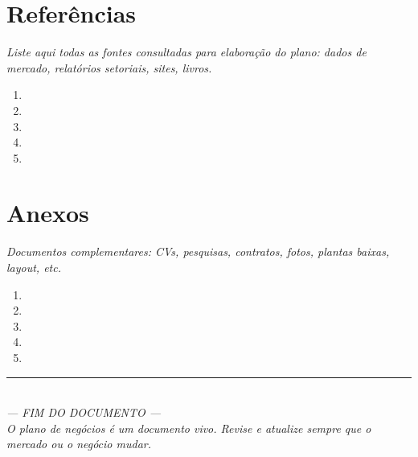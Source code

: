 \documentclass[
	12pt,
	openright,
	oneside,
	a4paper,
	chapter=TITLE,
	section=TITLE,
	english,
	brazil
	]{abntex2}
\newcommand{\icampo}{%
	\hrulefill
}
\newcommand{\instrucao}[1]{%
	\vspace{0.3cm}%
	\noindent%
	{%
		\setlength{\fboxsep}{6pt}%
		\colorbox{azul-claro}{%
			\begin{minipage}{\dimexpr\textwidth-2\fboxsep\relax}%
				\setlength{\parindent}{1.25cm}%
				{\color{cinza-instrucao}\small\itshape #1}%
			\end{minipage}%
		}%
	}%
	\vspace{0.3cm}%
}
\begin{document}
\clearpage

\chapter{Referências}

\instrucao{Liste aqui todas as fontes consultadas para elaboração do plano: dados de mercado, relatórios setoriais, sites, livros.}

\begin{enumerate}[itemsep=0.3cm]
	\item \icampo
	\item \icampo
	\item \icampo
	\item \icampo
	\item \icampo
\end{enumerate}

\clearpage

\chapter{Anexos}

\instrucao{Documentos complementares: CVs, pesquisas, contratos, fotos, plantas baixas, layout, etc.}

\begin{enumerate}[itemsep=0.3cm]
	\item \icampo
	\item \icampo
	\item \icampo
	\item \icampo
	\item \icampo
\end{enumerate}

\vspace{1cm}

{
\centering
\color{cinza-instrucao}
\rule{0.6\textwidth}{0.4pt} \\[0.3cm]
\textit{--- FIM DO DOCUMENTO ---} \\[0.3cm]
\textit{O plano de negócios é um documento vivo. Revise e atualize sempre que o mercado ou o negócio mudar.}
\par
}
\end{document}
